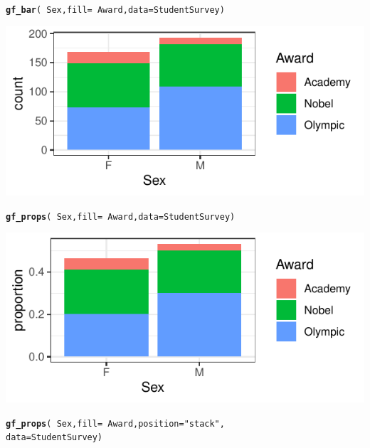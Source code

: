 \documentclass[10pt]{report}\usepackage[]{graphicx}\usepackage[]{xcolor}
\makeatletter
\newcommand{\hlsng}[1]{\textcolor[rgb]{0.192,0.494,0.8}{#1}}%
\newcommand{\hlopt}[1]{\textcolor[rgb]{0,0,0}{#1}}%
\newcommand{\hldef}[1]{\textcolor[rgb]{0.345,0.345,0.345}{#1}}%
\newcommand{\hlkwc}[1]{\textcolor[rgb]{0.333,0.667,0.333}{#1}}%
\newcommand{\hlkwd}[1]{\textcolor[rgb]{0.737,0.353,0.396}{\textbf{#1}}}%
\newenvironment{kframe}{%
 \def\at@end@of@kframe{}%
 \ifinner\ifhmode%
  \def\at@end@of@kframe{\end{minipage}}%
  \begin{minipage}{\columnwidth}%
 \fi\fi%
 \def\FrameCommand##1{\hskip\@totalleftmargin \hskip-\fboxsep
 \colorbox{shadecolor}{##1}\hskip-\fboxsep
     \hskip-\linewidth \hskip-\@totalleftmargin \hskip\columnwidth}%
 \MakeFramed {\advance\hsize-\width
   \@totalleftmargin\z@ \linewidth\hsize
   \@setminipage}}%
 {\par\unskip\endMakeFramed%
 \at@end@of@kframe}
\newenvironment{knitrout}{}{} %
\makeatother
\begin{document}
\newpage
{}
\begin{multicols}{3}


\begin{knitrout}\small
{}\color{fgcolor}\begin{kframe}
\begin{alltt}
\hlkwd{gf_bar}\hldef{(}\hlopt{~}\hldef{Sex,} \hlkwc{fill} \hldef{=} \hlopt{~}\hldef{Award,} \hlkwc{data}\hldef{=StudentSurvey)}
\end{alltt}
\end{kframe}

{\centering \includegraphics[width=.25\textwidth,height=.125\textwidth]{figure/unnamed-chunk-24-1} 

}


\end{knitrout}
\vspace*{-.20in}
\begin{knitrout}\small
{}\color{fgcolor}\begin{kframe}
\begin{alltt}
\hlkwd{gf_props}\hldef{(}\hlopt{~}\hldef{Sex,} \hlkwc{fill} \hldef{=} \hlopt{~}\hldef{Award,} \hlkwc{data}\hldef{=StudentSurvey)}
\end{alltt}
\end{kframe}

{\centering \includegraphics[width=.25\textwidth,height=.125\textwidth]{figure/unnamed-chunk-25-1} 

}


\end{knitrout}
\vspace*{-.20in}





\begin{knitrout}\small
{}\color{fgcolor}\begin{kframe}
\begin{alltt}
\hlkwd{gf_props}\hldef{(}\hlopt{~}\hldef{Sex,} \hlkwc{fill} \hldef{=} \hlopt{~}\hldef{Award,} \hlkwc{position} \hldef{=} \hlsng{"stack"}\hldef{,}
         \hlkwc{data}\hldef{=StudentSurvey)}
\end{alltt}
\end{kframe}


\end{knitrout}
\end{multicols}
\end{document}
